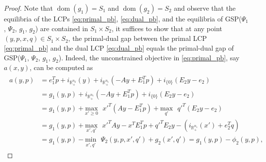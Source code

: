 \documentclass{article} %
\DeclareMathOperator{\dom}{dom}
\begin{document}
\begin{proof}
Note that $\dom(g_1) = S_1$ and $\dom(g_2) = S_2$ and observe that the
equilibria of the LCPs \eqref{eq:primal_pb}, \eqref{eq:dual_pb}, and
the equilibria of GSP($\Psi_1$, $\Psi_2$, $g_1$, $g_2$) are contained
in $S_1 \times S_2$, it suffices to show that at any point $(y, p, x,
q) \in S_1 \times S_2$, the primal-dual gap between the primal
LCP \eqref{eq:primal_pb} and the dual LCP \eqref{eq:dual_pb} equals
the primal-dual gap of GSP($\Psi_1$, $\Psi_2$, $g_1$, $g_2$).
Indeed, the unconstrained objective in \eqref{eq:primal_pb}, say
$a(x,y)$, can be computed as
\begin{eqnarray*}
  \begin{aligned}
    a(y,p) &= e_1^Tp +
    i_{\mathbb{R}^{n_2}_+}(y) + i_{\mathbb{R}^{n_1}_+}(-Ay + E_1^Tp) +
    i_{\{0\}}(E_2y - e_2)\\
    &= g_1(y,p) +
    i_{\mathbb{R}^{n_1}_+}(-Ay + E_1^Tp) + i_{\{0\}}(E_2y - e_2)\\
    &= g_1(y,p) + \underset{x' \geq
      0}{\text{max}}\text{ }x'^T(Ay - E_1^Tp) +
    \underset{q'}{\text{max}}\text{ }q'^T(E_2y - e_2)\\
    &= g_1(y,p) + \underset{x',
      q'}{\text{max}}\text{ }x'^TAy - x^TE_1^Tp + q'^TE_2y -
    (i_{\mathbb{R}^{n_1}_+}(x') + e_2^Tq)\\
    &= g_1(y,p)
      - \underset{x',q'}{\text{min}}\text{ }\Psi_2(y, p, x', q') + g_2(x',
      q') = g_1(y,p) -\phi_2(y,p),
  \end{aligned}
  \label{eq:a}
\end{eqnarray*}


\end{proof}
\end{document}
